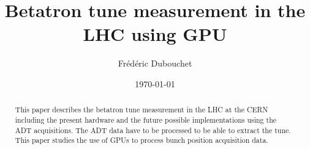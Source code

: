 \documentclass[a4paper]{report}
\title{Betatron tune measurement in the LHC using GPU}
\author{Fr\'ed\'eric Dubouchet}
\date{\today}
\begin{document}
\maketitle
\tableofcontents

\begin{abstract}
This paper describes the betatron tune measurement in the \gls{LHC} at the
\gls{CERN} including the present hardware and the future possible 
implementations using the \gls{ADT} acquisitions. The \gls{ADT} data have to 
be processed to be able to extract the \gls{tune}. This paper studies the use
of \glspl{GPU} to process \gls{bunch} position acquisition data.
\end{abstract}







\printglossaries


\end{document}
